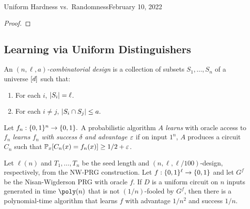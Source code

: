 \begin{lecture}{4}{Uniform Hardness vs.\ Randomness}{February 10, 2022}
\begin{proof}
\end{proof}

\subsection{Learning via Uniform Distinguishers}

\begin{definition}
  An \emph{$(n, \ell, a)$-combinatorial design} is a collection of subsets
	$S_1, \ldots , S_n$ of a universe $[d]$ such that:
	\begin{enumerate}
		\item For each $i$, $\lvert S_i\rvert = \ell$.
		\item For each $i \neq j$, $\lvert S_i \cap S_j\rvert \leq a.$
	\end{enumerate}
\end{definition}


\begin{definition}
  Let $f_n : \{0, 1\}^n \to \{0, 1\}.$ A probabilistic algorithm $A$
  \emph{learns} with oracle access to $f_n$ \emph{learns $f_n$ with success
  $\delta$ and advantage $\varepsilon$} if on input $1^n$, $A$ produces a circuit
  $C_n$ such that $\mathbb{P}_x [C_n(x) = f_n(x)] \geq 1/2 + \varepsilon$.
\end{definition}

\begin{proposition}
  \label{prop:learning}
  Let $\ell(n)$ and $T_1, \dots, T_n$ be the seed length and $(n, \ell,
  \ell/100)$-design, respectively, from the NW-PRG construction. Let $f :
  \{0,1\}^\ell \to \{0, 1\}$ and let $G^f$ be the Nisan-Wigderson PRG with
  oracle $f$. If $D$ is a uniform circuit on $n$ inputs generated in time
  $\poly(n)$ that is not $(1/n)$-fooled by $G^f$, then there is a
  polynomial-time algorithm that learns $f$ with advantage $1/n^2$ and success
  $1/n$.
\end{proposition}


\end{lecture}

